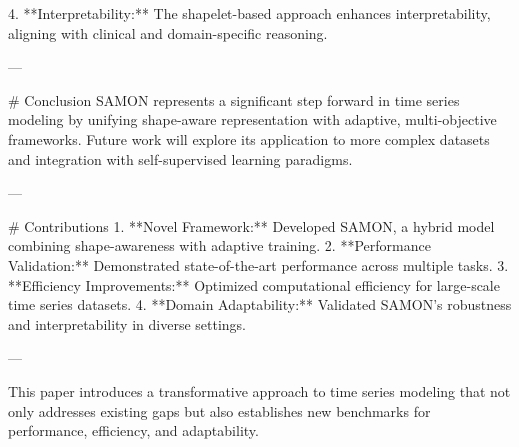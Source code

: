 4. **Interpretability:** The shapelet-based approach enhances interpretability, aligning with clinical and domain-specific reasoning.

---

# Conclusion  
SAMON represents a significant step forward in time series modeling by unifying shape-aware representation with adaptive, multi-objective frameworks. Future work will explore its application to more complex datasets and integration with self-supervised learning paradigms.

---

# Contributions  
1. **Novel Framework:** Developed SAMON, a hybrid model combining shape-awareness with adaptive training.
2. **Performance Validation:** Demonstrated state-of-the-art performance across multiple tasks.
3. **Efficiency Improvements:** Optimized computational efficiency for large-scale time series datasets.
4. **Domain Adaptability:** Validated SAMON's robustness and interpretability in diverse settings.

--- 

This paper introduces a transformative approach to time series modeling that not only addresses existing gaps but also establishes new benchmarks for performance, efficiency, and adaptability.